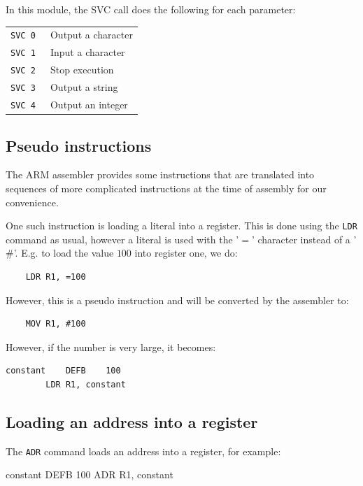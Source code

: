 In this module, the SVC call does the following for each parameter:

\begin{tabularx}{\textwidth}{l X}
	{\tt SVC 0 } & Output a character \\
	{\tt SVC 1 } & Input a character \\
	{\tt SVC 2 } & Stop execution \\
	{\tt SVC 3 } & Output a string \\
	{\tt SVC 4 } & Output an integer \\
\end{tabularx}

\subsection{Pseudo instructions}

The ARM assembler provides some instructions that are translated into sequences
of more complicated instructions at the time of assembly for our convenience.

One such instruction is loading a literal into a register. This is done using
the {\tt LDR} command as usual, however a literal is used with the '$=$'
character instead of a '$\#$'. E.g. to load the value $100$ into register one,
we do:

\begin{verbatim}
	LDR	R1,	=100
\end{verbatim}

However, this is a pseudo instruction and will be converted by the assembler to:

\begin{verbatim}
	MOV	R1,	#100
\end{verbatim}

However, if the number is very large, it becomes:

\begin{verbatim}
constant	DEFB	100
		LDR	R1, constant
\end{verbatim}

\subsection{Loading an address into a register}

The {\tt ADR} command loads an address into a register, for example:

\begin{listing}{1}
constant	DEFB	100
		ADR	R1, constant
\end{listing}

